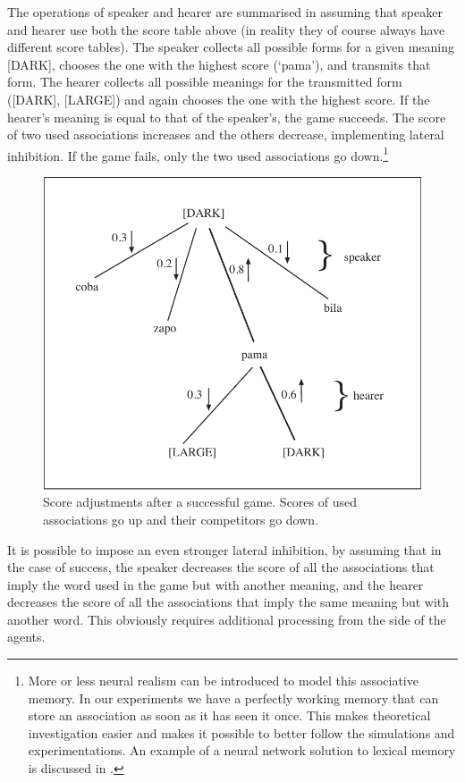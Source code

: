 The operations of speaker and hearer are summarised in 
 assuming that speaker and hearer
use both the score table above (in reality they of 
course always have different score tables). 
The speaker collects all possible
forms for a given meaning [DARK], chooses the one with the
highest score (`pama'), and transmits that form. 
The hearer collects all possible meanings for 
the transmitted form ([DARK], [LARGE]) and again chooses the one with
the highest score. If the hearer's meaning is equal to that
of the speaker's, the game succeeds. The score of 
two used associations increases and the others
decrease, implementing lateral 
inhibition. If the game fails, only the two used associations 
go down.\footnote{More or less neural realism can be introduced to 
model this associative memory. In our experiments we 
have a perfectly working memory that can store an 
association as soon as it has seen it once. This makes
theoretical investigation easier and makes it possible
to better follow the simulations and experimentations.  
An example of a neural network solution to lexical
memory is discussed in \cite{Cangelosi:1996}.}


\begin{figure}[htbp]
  \centerline{\includegraphics[width=.60\textwidth]{chap5/figs/incr-decr.pdf}}
\caption{\label{incr-decr}Score adjustments after a successful game. Scores of used 
associations go up and their competitors go down.}
\end{figure}

It is possible to impose an even stronger
lateral inhibition, by assuming that in the case of 
success, the speaker decreases the score of 
all the associations that imply the word used in 
the game but with another meaning, and the 
hearer decreases the score of all the associations
that imply the same meaning but with another 
word. This obviously requires additional processing
from the side of the agents. 

